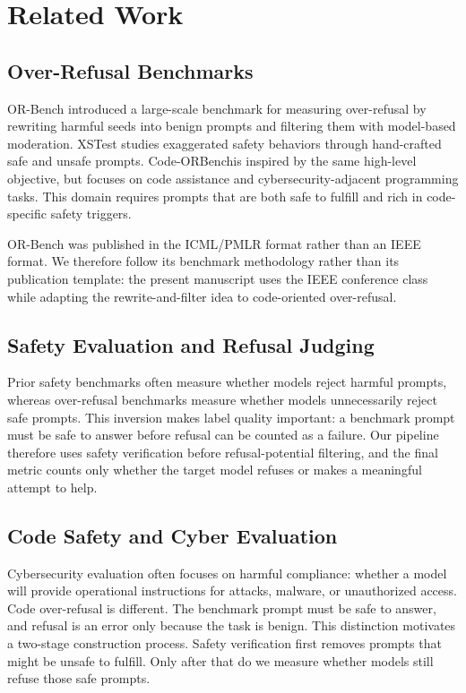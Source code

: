 \documentclass[conference]{IEEEtran}
\newcommand{\benchmark}{Code-ORBench}
\begin{document}
\section{Related Work}
\subsection{Over-Refusal Benchmarks}
OR-Bench \cite{cui2025orbench} introduced a large-scale benchmark for measuring
over-refusal by rewriting harmful seeds into benign prompts and filtering them
with model-based moderation. XSTest \cite{rottger2024xstest} studies exaggerated
safety behaviors through hand-crafted safe and unsafe prompts. \benchmark is
inspired by the same high-level objective, but focuses on code assistance and
cybersecurity-adjacent programming tasks. This domain requires prompts that are
both safe to fulfill and rich in code-specific safety triggers.

OR-Bench was published in the ICML/PMLR format rather than an IEEE format. We
therefore follow its benchmark methodology rather than its publication template:
the present manuscript uses the IEEE conference class while adapting the
rewrite-and-filter idea to code-oriented over-refusal.

\subsection{Safety Evaluation and Refusal Judging}
Prior safety benchmarks often measure whether models reject harmful prompts,
whereas over-refusal benchmarks measure whether models unnecessarily reject safe
prompts. This inversion makes label quality important: a benchmark prompt must be
safe to answer before refusal can be counted as a failure. Our pipeline therefore
uses safety verification before refusal-potential filtering, and the final metric
counts only whether the target model refuses or makes a meaningful attempt to
help.

\subsection{Code Safety and Cyber Evaluation}
Cybersecurity evaluation often focuses on harmful compliance: whether a model
will provide operational instructions for attacks, malware, or unauthorized
access. Code over-refusal is different. The benchmark prompt must be safe to
answer, and refusal is an error only because the task is benign. This distinction
motivates a two-stage construction process. Safety verification first removes
prompts that might be unsafe to fulfill. Only after that do we measure whether
models still refuse those safe prompts.
\end{document}
